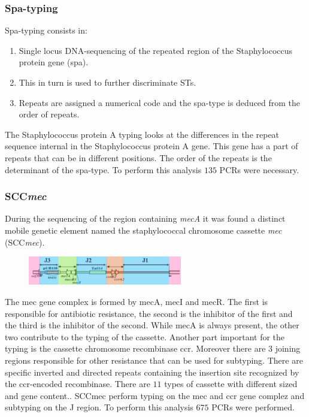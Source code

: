         \subsubsection{Spa-typing}
        Spa-typing consists in:

        \begin{multicols}{2}
            \begin{enumerate}
                \item Single locus DNA-sequencing of the repeated region of the Staphylococcus protein gene (spa).
                \item This in turn is used to further discriminate STs.
                \item Repeats are assigned a numerical code and the spa-type is deduced from the order of repeats.
            \end{enumerate}
        \end{multicols}

        The Staphylococcus protein A typing looks at the differences in the repeat sequence internal in the Staphylococcus protein A gene.
        This gene has a part of repeats that can be in different positions.
        The order of the repeats is the determinant of the spa-type.
        To perform this analysis $135$ PCRs were necessary.

        \subsubsection{SCC\emph{mec}}
        During the sequencing of the region containing \emph{mecA} it was found a distinct mobile genetic element named the staphylococcal chromosome cassette \emph{mec} (SCC\emph{mec}).

        \begin{figure}[h]
        \centering
        \includegraphics[width=0.6\textwidth]{SCCmec.png}
        \caption{}
        \end{figure}

        The mec gene complex is formed by mecA, mecI and mecR.
        The first is responsible for antibiotic resistance, the second is the inhibitor of the first and the third is the inhibitor of the second.
        While mecA is always present, the other two contribute to the typing of the cassette.
        Another part important for the typing is the cassette chromosome recombinase ccr.
        Moreover there are $3$ joining regions responsible for other resistance that can be used for subtyping.
        There are specific inverted and directed repeats containing the insertion site recognized by the ccr-encoded recombinase.
        There are $11$ types of cassette with different sized and gene content..
        SCCmec perform typing on the mec and ccr gene complez and subtyping on the J region.
        To perform this analysis $675$ PCRs were performed.

